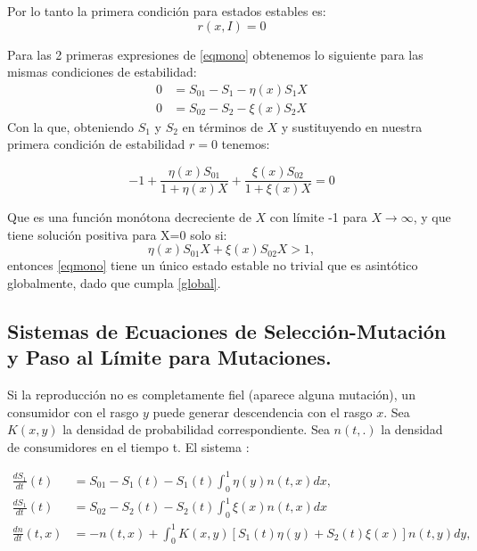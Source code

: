 Por lo tanto la primera condición para estados estables es:
\begin{equation*}
	r(x,I)=0
\end{equation*}

Para las 2 primeras expresiones de \eqref{eqmono} obtenemos lo siguiente para las mismas condiciones de estabilidad:
\begin{equation*}
	\begin{split}
		0 & =S_{01}-S_1-\eta(x)S_1X \\  0&=S_{02}-S_2-\xi(x)S_2X
	\end{split}
\end{equation*}
Con la que, obteniendo $S_1$ y $S_2$ en términos de $X$ y sustituyendo en nuestra primera condición de estabilidad $r=0$ tenemos:

\begin{equation*}
	-1+\frac{\eta(x)S_{01}}{1+\eta(x)X}+\frac{\xi(x)S_{02}}{1+\xi(x)X}=0
\end{equation*}

Que es una función monótona decreciente de $X$ con límite -1 para $X\to\infty$, y que tiene solución positiva para X=0 solo si:
\begin{equation}\label{global}
	\eta(x)S_{01}X+\xi(x)S_{02}X>1,
\end{equation}
entonces \eqref{eqmono} tiene un único estado estable no trivial que es asintótico globalmente, dado que cumpla \eqref{global}.

\subsection{Sistemas de Ecuaciones de Selección-Mutación y Paso al Límite para Mutaciones.}

Si la reproducción no es completamente fiel (aparece alguna mutación), un consumidor con el rasgo $y$ puede generar descendencia con el rasgo $x$. Sea $K(x,y)$ la densidad de probabilidad correspondiente. Sea $n(t,.)$ la densidad de consumidores en el tiempo t. El sistema \citep{dieckman2005}:

\begin{equation}\label{core}
	\begin{split}
		\frac{d S_1}{dt}(t) & =S_{01}-S_1(t)-S_1(t)\int_{0}^{1}\eta(y)n(t,x)dx,                \\
		\frac{d S_1}{dt}(t) & =S_{02}-S_2(t)-S_2(t)\int_{0}^{1}\xi(x)n(t,x)dx                  \\
		\frac{d n}{dt}(t,x) & =-n(t,x)+\int_{0}^{1}K(x,y)[S_1(t)\eta(y)+S_2(t)\xi(x)]n(t,y)dy,
	\end{split}
\end{equation}

